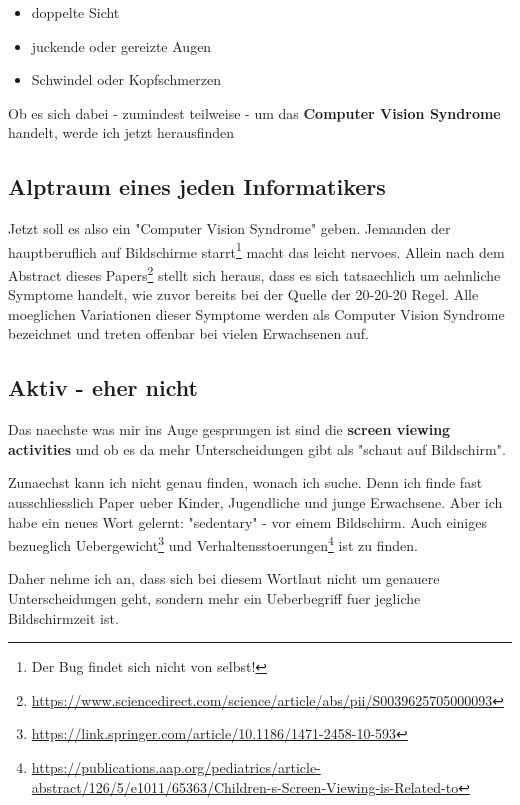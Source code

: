 \newpage

\begin{itemize}
  \item doppelte Sicht
  \item juckende oder gereizte Augen
  \item Schwindel oder Kopfschmerzen
\end{itemize}

Ob es sich dabei - zumindest teilweise - 
um das \textbf{Computer Vision Syndrome} handelt, werde ich jetzt herausfinden

\subsection{Alptraum eines jeden Informatikers}

Jetzt soll es also ein "Computer Vision Syndrome" geben. Jemanden der hauptberuflich auf Bildschirme starrt\footnote{Der Bug findet sich nicht von selbst!}
macht das leicht nervoes. Allein nach dem Abstract dieses Papers\footnote{\url{https://www.sciencedirect.com/science/article/abs/pii/S0039625705000093}}
stellt sich heraus, dass es sich tatsaechlich um aehnliche Symptome handelt, wie zuvor bereits bei der Quelle der 20-20-20 Regel. 
Alle moeglichen Variationen dieser Symptome werden als Computer Vision Syndrome bezeichnet und treten offenbar bei vielen Erwachsenen auf.

\subsection{Aktiv - eher nicht}

Das naechste was mir ins Auge gesprungen ist sind die \textbf{screen viewing activities} und ob es da mehr Unterscheidungen gibt als "schaut auf Bildschirm".

Zunaechst kann ich nicht genau finden, wonach ich suche. Denn ich finde fast ausschliesslich Paper ueber Kinder, Jugendliche und junge Erwachsene.
Aber ich habe ein neues Wort gelernt: "sedentary" - vor einem Bildschirm. Auch einiges bezueglich 
Uebergewicht\footnote{\url{https://link.springer.com/article/10.1186/1471-2458-10-593}}
und Verhaltensstoerungen\footnote{\url{https://publications.aap.org/pediatrics/article-abstract/126/5/e1011/65363/Children-s-Screen-Viewing-is-Related-to}}
ist zu finden.

Daher nehme ich an, dass sich bei diesem Wortlaut nicht um genauere Unterscheidungen geht, sondern mehr ein Ueberbegriff fuer jegliche Bildschirmzeit ist.

